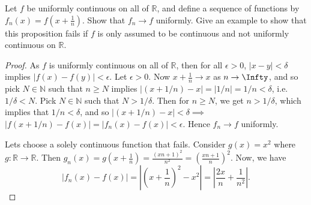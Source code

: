 \documentclass[oneside]{amsart}
\theoremstyle{definition}
\newcommand{\rr}{\mathbb R}
\newcommand{\nn}{\mathbb N}
\begin{document}
\begin{tcolorbox}[colback=black!5!white,colframe=black!75!black,title= Exercise $5.2.$] Let $f$ be uniformly continuous on all of $\rr$, and define a sequence of functions by $f_n(x) = f(x+\frac{1}{n})$. Show that $f_n \to f$ uniformly. Give an example to show that this proposition fails if $f$ is only assumed to be continuous and not uniformly continuous on $\rr$.
\tcblower 
\begin{proof} As $f$ is uniformly continuous on all of $\rr$, then for all $\epsilon > 0$, $|x-y| < \delta $ implies $ |f(x) - f(y)|< \epsilon$. Let $\epsilon > 0$. Now $x + \frac{1}{n} \to x$ as $n \to \Infty$, and so pick $N \in \nn$ such that $n \geq N$ implies $|(x+1/n)-x|=|1/n|=1/n<\delta$, i.e. $1/\delta < N$. Pick $N \in \nn$ such that $N>1/\delta$. Then for $n \geq N$, we get $n > 1/\delta$, which implies that $1/n < \delta$, and so $|(x+1/n)-x| < \delta \implies$ $|f(x+1/n)-f(x)| = |f_n(x) - f(x)| < \epsilon$. Hence $f_n \to f$ uniformly. 

Lets choose a solely continuous function that fails. Consider $g(x) =x^2$ where $g \colon \rr \to \rr$. Then $g_n(x) = g(x+\frac{1}{n}) = \frac{(xn+1)^2}{n^2} = (\frac{xn+1}{n})^2$. Now, we have  
\[
|f_n(x) - f(x)| = \left | \left (x+\frac{1}{n}\right)^2 -x^2 \right|= \left| \frac{2x}{n} + \frac{1}{n^2} \right |.
\]
\end{proof} 
\end{tcolorbox}
\end{document}
